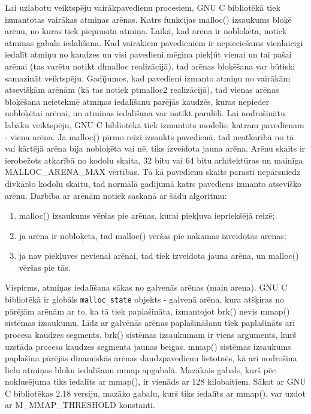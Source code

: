 Lai uzlabotu veiktspēju vairākpavedienu procesiem, GNU C bibliotēkā tiek izmantotas vairākas atmiņas arēnas. 
Katrs funkcijas malloc() izsaukums bloķē arēnu, no kuras tiek pieprasītā atmiņa. 
Laikā, kad arēna ir nobloķēta, notiek atmiņas gabala iedalīšana.
Kad vairākiem pavedieniem ir nepieciešams vienlaicīgi iedalīt atmiņu no kaudzes un visi pavedieni mēģina piekļūt vienai un tai pašai arēnai (tas varētu notikt dlmalloc realizācijā), tad arēnas bloķēšana var būtiski samazināt veiktspēju.
Gadījumos, kad pavedieni izmanto atmiņu no vairākām atsevišķām arēnām (kā tas notiek ptmalloc2 realizācijā), tad vienas arēnas bloķēšana neietekmē atmiņas iedalīšanu parējās kaudzēs, kuras nepieder nobloķētai arēnai, un atmiņas iedalīšana var notikt paralēli.
Lai nodrošinātu labāku veiktspēju, GNU C bibliotēkā tiek izmantots modelis: katram pavedienam - viena arēna. 
Ja malloc() pirmo reizi izsaukts pavedienā, tad neatkarībā no tā vai kārtējā arēna bija nobloķēta vai nē, tiks izveidota jauna arēna.
Arēnu skaits ir ierobežots atkarībā no kodolu skaita, 32 bitu vai 64 bitu arhitektūras un mainīga MALLOC\_ARENA\_MAX vērtības.
Tā kā pavedienu skaits parasti nepārsniedz divkāršo kodolu skaitu, tad normālā gadījumā katrs pavediens izmanto atsevišķo arēnu. 
Darbība ar arēnām notiek saskaņā ar šādu algoritmu: 
\begin{enumerate}
\item malloc() izsaukums vēršas pie arēnas, kurai piekļuva iepriekšējā reizē;
\item ja arēna ir nobloķēta, tad malloc() vēršas pie nākamas izveidotās arēnas;
\item ja nav piekļuves nevienai arēnai, tad tiek izveidota jauna arēna, un malloc() vēršas pie tās.
\end{enumerate}

Vispirms, atmiņas iedalīšana sākas no galvenās arēnas (main arena). 
GNU C bibliotēkā ir globāls \texttt{malloc\_state} objekts - galvenā arēna, kura atšķiras no pārējām arēnām ar to, ka tā tiek paplašināta, izmantojot brk() nevis  mmap() sistēmas izsaukumu. 
Līdz ar galvēnās arēnas paplašināšanu tiek paplašināts arī procesa kaudzes segments.
brk() sistēmas izsaukumam ir viens arguments, kurš uzstāda procesa kaudzes segmenta jaunas beigas.
mmap() sistēmas izsaukums paplašina pārējās dinamiskās arēnas daudzpavedienu lietotnēs, kā arī nodrošina lielu atmiņas bloku iedalīšanu mmap apgabalā.
Mazākais gabals, kurš pēc noklusējuma tiks iedalīts ar mmap(), ir vienāds ar 128 kilobaitiem. 
Sākot ar GNU C bibliotēkas 2.18 versiju, mazāko gabalu, kurš tiks iedalīts ar mmap(), var uzdot ar M\_MMAP\_THRESHOLD konstanti.





